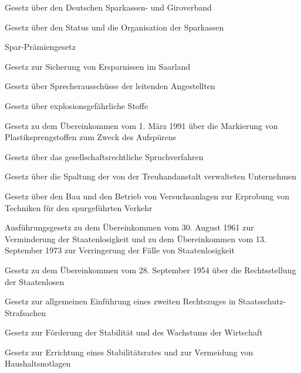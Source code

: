 \item[{SparkGiroVerbG}] Gesetz über den Deutschen Sparkassen- und Giroverband

\item[{SparkSOG}] Gesetz über den Status und die Organisation der Sparkassen

\item[{SparPG}] Spar-Prämiengesetz

\item[{SparSichSaarG}] Gesetz zur Sicherung von Ersparnissen im Saarland

\item[{SprAuG}] Gesetz über Sprecherausschüsse der leitenden Angestellten

\item[{SprengG-1976}] Gesetz über explosionsgefährliche Stoffe

\item[{SprengMarkÜbkG}] Gesetz zu dem Übereinkommen vom 1. März 1991 über die Markierung von Plastiksprengstoffen zum Zweck des Aufspürens

\item[{SpruchG}] Gesetz über das gesellschaftsrechtliche Spruchverfahren

\item[{SpTrUG}] Gesetz über die Spaltung der von der Treuhandanstalt verwalteten Unternehmen

\item[{SpurVerkErprG}] Gesetz über den Bau und den Betrieb von Versuchsanlagen zur Erprobung von Techniken für den spurgeführten Verkehr

\item[{StaatenlMindÜbkAG}] Ausführungsgesetz zu dem Übereinkommen vom 30. August 1961 zur Verminderung der Staatenlosigkeit und zu dem Übereinkommen vom 13. September 1973 zur Verringerung der Fälle von Staatenlosigkeit

\item[{StaatenlÜbkG}] Gesetz zu dem Übereinkommen vom 28. September 1954 über die Rechtsstellung der Staatenlosen

\item[{StaatsSchRZugG}] Gesetz zur allgemeinen Einführung eines zweiten Rechtszuges in Staatsschutz-Strafsachen

\item[{StabG}] Gesetz zur Förderung der Stabilität und des Wachstums der Wirtschaft

\item[{StabiRatG}] Gesetz zur Errichtung eines Stabilitätsrates und zur Vermeidung von Haushaltsnotlagen

